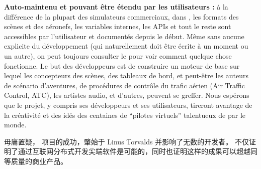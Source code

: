 \begin{itemize}
{\item\textbf{Auto-maintenu et pouvant \^{e}tre \'{e}tendu par les utilisateurs :}
   \`{a} la diff\'{e}rence de la plupart des simulateurs
  commerciaux, dans \FlightGear{}, les formats des sc\`{e}nes et des a\'{e}ronefs, les variables
  internes, les APIs et tout le reste sont accessibles par l'utilisateur et document\'{e}s depuis
  le d\'{e}but. M\^{e}me sans aucune  explicite du d\'{e}veloppement (qui naturellement
  doit \^{e}tre \'{e}crite \`{a} un moment ou un autre), on peut toujours consulter le  pour voir
  comment quelque chose fonctionne. Le but des d\'{e}veloppeurs est de construire un moteur de base sur lequel les
  concepteurs des sc\`{e}nes, des tableaux de bord, et peut-\^{e}tre les auteurs de sc\'{e}nario d'aventures, de
  proc\'{e}dures de contr\^{o}le du trafic a\'{e}rien (Air Traffic Control, ATC), les artistes audio, et d'autres,
  peuvent se greffer. Nous esp\'{e}rons que le projet, y compris ses d\'{e}veloppeurs et ses utilisateurs, tireront
  avantage de la cr\'{e}ativit\'{e} et des id\'{e}s des centaines de ``pilotes virtuels'' talentueux de par le monde.
}{}

\end{itemize}
\ifchinese
毋庸置疑， 项目的成功，肇始于 Linus Torvalds  并影响了无数的开发者。 不仅证明了通过互联网分布式开发尖端软件是可能的，同时也证明这样的成果可以超越同等质量的商业产品。
\fi
